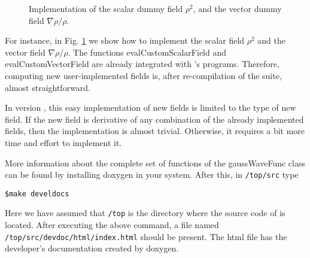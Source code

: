 \begin{figure}

\caption{Implementation of the scalar dummy field $\rho^2$, and the vector dummy field
$\nabla\rho/\rho$.}
\label{fig:codecustfld}
\end{figure}

For instance, in Fig. \ref{fig:codecustfld} we show how to implement the scalar field $\rho^2$
and the vector field $\nabla\rho/\rho$. The functions evalCustomScalarField and evalCustomVectorField
are already integrated with \DTK's programs. Therefore, computing new user-implemented fields
is, after re-compilation of the suite, almost straightforward. 

In version \dtkversion, this easy implementation of new fields is limited to the type of
new field. If the new field is derivative of any combination of the already implemented fields,
then the implementation is almost trivial. Otherwise, it requires a bit more time and effort to
implement it.

More information about the complete set of functions of the gaussWaveFunc class can be found by
installing doxygen in your system. After this, in \texttt{/top/src} type
\begin{lstlisting}
$make develdocs
\end{lstlisting}
Here we have assumed that \texttt{/top} is the directory where the source code of \DTK{} is 
located. After executing the above command, a file named \texttt{/top/src/devdoc/html/in\-dex.\-html}
should be present. The html file has the developer's documentation created by doxygen.

